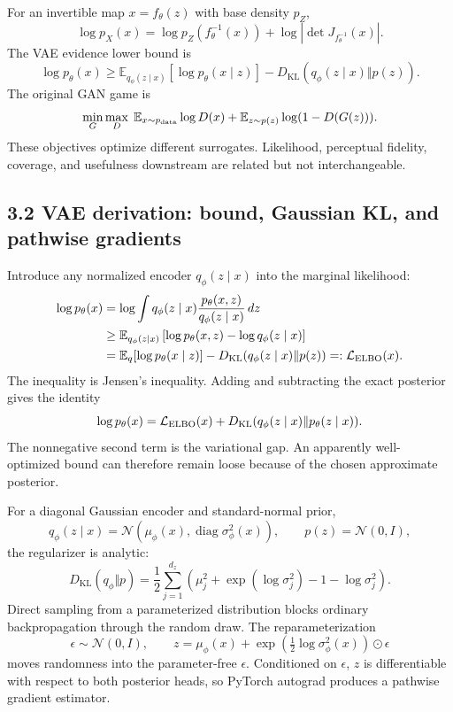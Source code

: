 \documentclass[11pt]{article}
\newcommand{\E}{\mathbb{E}}
\begin{document}
For an invertible map $x=f_\theta(z)$ with base density $p_Z$,
\[
 \log p_X(x)=\log p_Z(f_\theta^{-1}(x))
 +\log\left|\det J_{f_\theta^{-1}}(x)\right|.
\]
The VAE evidence lower bound is
\[
 \log p_\theta(x)\geq
 \E_{q_\phi(z\mid x)}[\log p_\theta(x\mid z)]
 -D_{\mathrm{KL}}(q_\phi(z\mid x)\Vert p(z)).
\]
The original GAN game is
\[
 \min_G\max_D\;\E_{x\sim p_{\rm data}}\log D(x)
 +\E_{z\sim p(z)}\log(1-D(G(z))).
\]
These objectives optimize different surrogates. Likelihood, perceptual fidelity,
coverage, and usefulness downstream are related but not interchangeable.

\subsection*{3.2 VAE derivation: bound, Gaussian KL, and pathwise gradients}

Introduce any normalized encoder $q_\phi(z\mid x)$ into the marginal likelihood:
\begin{align*}
\log p_\theta(x)
&=\log\int q_\phi(z\mid x)
\frac{p_\theta(x,z)}{q_\phi(z\mid x)}\,dz\\
&\geq \E_{q_\phi(z\mid x)}
\left[\log p_\theta(x,z)-\log q_\phi(z\mid x)\right]\\
&=\E_q[\log p_\theta(x\mid z)]
-D_{\mathrm{KL}}(q_\phi(z\mid x)\Vert p(z))
=:\mathcal L_{\rm ELBO}(x).
\end{align*}
The inequality is Jensen's inequality. Adding and subtracting the exact posterior
gives the identity
\[
\log p_\theta(x)=\mathcal L_{\rm ELBO}(x)
+D_{\mathrm{KL}}(q_\phi(z\mid x)\Vert p_\theta(z\mid x)).
\]
The nonnegative second term is the variational gap. An apparently well-optimized
bound can therefore remain loose because of the chosen approximate posterior.

For a diagonal Gaussian encoder and standard-normal prior,
\[
q_\phi(z\mid x)=\mathcal N\!\left(
\mu_\phi(x),\operatorname{diag}\sigma_\phi^2(x)\right),
\qquad p(z)=\mathcal N(0,I),
\]
the regularizer is analytic:
\[
D_{\mathrm{KL}}(q_\phi\Vert p)
=\frac12\sum_{j=1}^{d_z}
\left(\mu_j^2+\exp(\log\sigma_j^2)-1-\log\sigma_j^2\right).
\]
Direct sampling from a parameterized distribution blocks ordinary backpropagation
through the random draw. The reparameterization
\[
\epsilon\sim\mathcal N(0,I),\qquad
z=\mu_\phi(x)+\exp\!\left(\tfrac12\log\sigma_\phi^2(x)\right)
\odot\epsilon
\]
moves randomness into the parameter-free $\epsilon$. Conditioned on $\epsilon$,
$z$ is differentiable with respect to both posterior heads, so PyTorch autograd
produces a pathwise gradient estimator.
\end{document}
